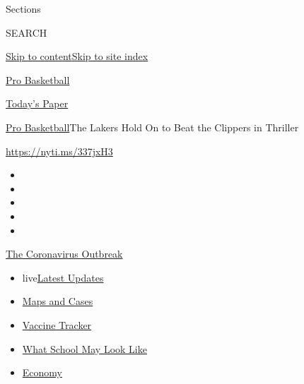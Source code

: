 Sections

SEARCH

\protect\hyperlink{site-content}{Skip to
content}\protect\hyperlink{site-index}{Skip to site index}

\href{https://www.nytimes.com/section/sports/basketball}{Pro Basketball}

\href{https://myaccount.nytimes.com/auth/login?response_type=cookie\&client_id=vi}{}

\href{https://www.nytimes.com/section/todayspaper}{Today's Paper}

\href{/section/sports/basketball}{Pro Basketball}\textbar{}The Lakers
Hold On to Beat the Clippers in Thriller

\url{https://nyti.ms/337jxH3}

\begin{itemize}
\item
\item
\item
\item
\item
\end{itemize}

\href{https://www.nytimes.com/news-event/coronavirus?action=click\&pgtype=Article\&state=default\&region=TOP_BANNER\&context=storylines_menu}{The
Coronavirus Outbreak}

\begin{itemize}
\tightlist
\item
  live\href{https://www.nytimes.com/2020/08/01/world/coronavirus-covid-19.html?action=click\&pgtype=Article\&state=default\&region=TOP_BANNER\&context=storylines_menu}{Latest
  Updates}
\item
  \href{https://www.nytimes.com/interactive/2020/us/coronavirus-us-cases.html?action=click\&pgtype=Article\&state=default\&region=TOP_BANNER\&context=storylines_menu}{Maps
  and Cases}
\item
  \href{https://www.nytimes.com/interactive/2020/science/coronavirus-vaccine-tracker.html?action=click\&pgtype=Article\&state=default\&region=TOP_BANNER\&context=storylines_menu}{Vaccine
  Tracker}
\item
  \href{https://www.nytimes.com/interactive/2020/07/29/us/schools-reopening-coronavirus.html?action=click\&pgtype=Article\&state=default\&region=TOP_BANNER\&context=storylines_menu}{What
  School May Look Like}
\item
  \href{https://www.nytimes.com/live/2020/07/31/business/stock-market-today-coronavirus?action=click\&pgtype=Article\&state=default\&region=TOP_BANNER\&context=storylines_menu}{Economy}
\end{itemize}

